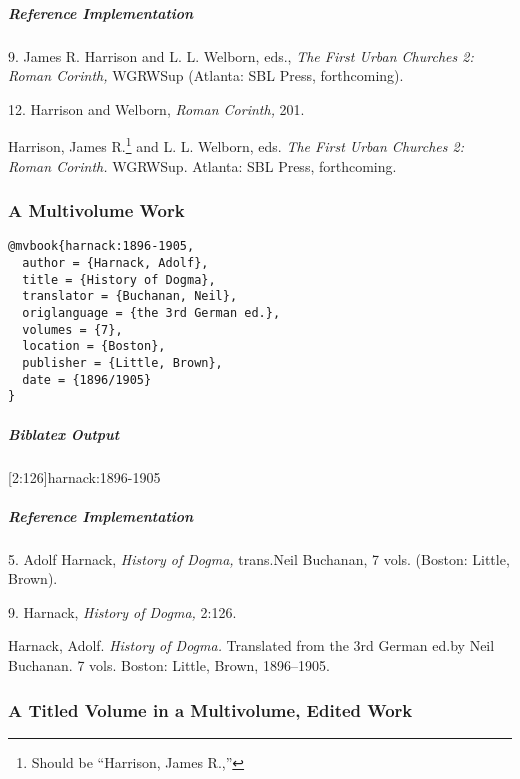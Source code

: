 \documentclass[a4paper]{article}
\newenvironment{biboutput}{%
  \subparagraph{Biblatex Output}
}{\color{black}}
\newenvironment{refimp}{%
  \subparagraph{Reference Implementation}
  \color{reference-colour}
  \rm
}{\par\color{black}}
\begin{document}
\begin{refimp}
  \hspace*{\bibindent}9. James R. Harrison and L. L. Welborn, eds., \emph{The
  First Urban Churches 2: Roman Corinth,} WGRWSup (Atlanta: SBL Press,
  forthcoming).

  \hspace*{\bibindent}12. Harrison and Welborn, \emph{Roman Corinth,} 201.

  \hangindent\bibindent Harrison, James R.\footnote{Should be “Harrison, James
  R.,”} and L. L. Welborn, eds. \emph{The First Urban Churches 2: Roman
  Corinth.} WGRWSup. Atlanta: SBL Press, forthcoming.

\end{refimp}

\subsubsection{A Multivolume Work}

\begin{lstlisting}
@mvbook{harnack:1896-1905,
  author = {Harnack, Adolf},
  title = {History of Dogma},
  translator = {Buchanan, Neil},
  origlanguage = {the 3rd German ed.},
  volumes = {7},
  location = {Boston},
  publisher = {Little, Brown},
  date = {1896/1905}
}
\end{lstlisting}  

\begin{biboutput}
  [2:126]{harnack:1896-1905}
\end{biboutput}

\begin{refimp}
  \hspace*{\bibindent}5. Adolf Harnack, \emph{History of Dogma,} trans.\@ Neil
  Buchanan, 7 vols. (Boston: Little, Brown).

  \hspace*{\bibindent}9. Harnack, \emph{History of Dogma,} 2:126.

  \hangindent\bibindent Harnack, Adolf. \emph{History of Dogma.} Translated
  from the 3rd German ed.\@ by Neil Buchanan. 7 vols. Boston: Little, Brown,
  1896–1905.
\end{refimp}

\subsubsection{A Titled Volume in a Multivolume, Edited Work}
\end{document}
